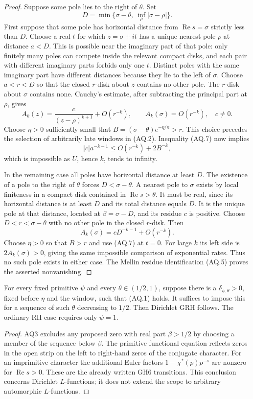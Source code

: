 \begin{proof}
Suppose some pole lies to the right of $\theta$.  Set
\[
 D=\min\{\sigma-\theta,\ \inf_\rho|\sigma-\rho|\}.
\]
First suppose that some pole has horizontal distance from
$\operatorname{Re}s=\sigma$ strictly less than $D$.  Choose a real
$t$ for which $z=\sigma+it$ has a unique nearest pole $\rho$ at
distance $a<D$.  This is possible near the imaginary part of that
pole: only finitely many poles can compete inside the relevant
compact disks, and each pair with different imaginary parts
forbids only one $t$.  Distinct poles with the same imaginary part
have different distances because they lie to the left of $\sigma$.
Choose $a<r<D$ so that the closed $r$-disk about $z$ contains no
other pole.  The $r$-disk about $\sigma$ contains none.  Cauchy's
estimate, after subtracting the principal part at $\rho$, gives
\[
 A_k(z)=\frac{c}{(z-\rho)^{k+1}}+O(r^{-k}),\qquad
 A_k(\sigma)=O(r^{-k}),\quad c\ne0.
\]
Choose $\eta>0$ sufficiently small that
$B=(\sigma-\theta)e^{-\eta/\kappa}>r$.
This choice precedes the selection of arbitrarily late windows in
(AQ.2).  Inequality (AQ.7) now implies
\[
 |c|a^{-k-1}\le O(r^{-k})+2B^{-k},
\]
which is impossible as $U$, hence $k$, tends to infinity.

In the remaining case all poles have horizontal distance at least
$D$.  The existence of a pole to the right of $\theta$ forces
$D<\sigma-\theta$.  A nearest pole to $\sigma$ exists by local
finiteness in a compact disk contained in
$\operatorname{Re}s>\theta$.  It must be real, since its horizontal
distance is at least $D$ and its total distance equals $D$.
It is the unique pole at that distance, located at $\beta=\sigma-D$,
and its residue $c$ is positive.  Choose
$D<r<\sigma-\theta$ with no other pole in the closed $r$-disk.
Then
\[
 A_k(\sigma)=cD^{-k-1}+O(r^{-k}).
\]
Choose $\eta>0$ so that $B>r$ and use (AQ.7) at $t=0$.
For large $k$ its left side is $2A_k(\sigma)>0$, giving the same
impossible comparison of exponential rates.  Thus no such pole
exists in either case.  The Mellin residue identification (AQ.5)
proves the asserted nonvanishing.
\end{proof}

\begin{corollary}
\label{claim:AQ4}
For every fixed primitive $\psi$ and every
$\theta\in(1/2,1)$, suppose there is a $\delta_{\psi,\theta}>0$,
fixed before $\eta$ and the window, such that (AQ.1) holds.
It suffices to impose this for a sequence of such $\theta$
decreasing to $1/2$.  Then Dirichlet GRH follows.  The ordinary RH
case requires only $\psi=1$.
\end{corollary}
\begin{proof}
AQ3 excludes any proposed zero with real part $\beta>1/2$ by
choosing a member of the sequence below $\beta$.
The primitive functional equation reflects zeros in the open
strip on the left to right-hand zeros of the conjugate character.
For an imprimitive character the additional Euler factors
$1-\chi^*(p)p^{-s}$ are nonzero for $\operatorname{Re}s>0$.
These are the already written GH6 transitions.  This conclusion
concerns Dirichlet $L$-functions; it does not extend the scope to
arbitrary automorphic $L$-functions.
\end{proof}

